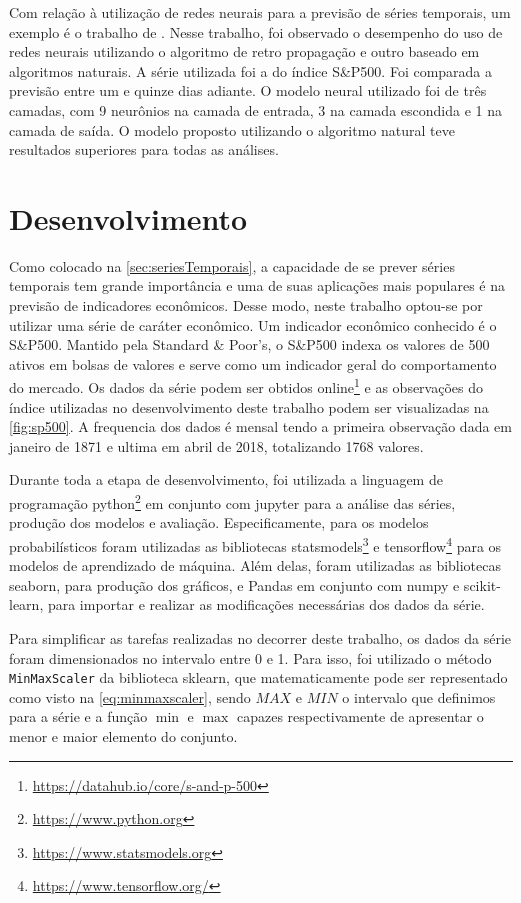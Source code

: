 \documentclass[
    12pt,
    oneside,
    a4paper,
    english,
    brazil
]{abntex2}
\begin{document}
Com relação à utilização de redes  neurais para a previsão de séries temporais,
um exemplo é o trabalho de . Nesse trabalho, foi observado
o desempenho do uso de redes neurais utilizando o algoritmo de retro propagação
e  outro baseado  em algoritmos  naturais. A  série utilizada  foi a  do índice
S\&P500. Foi  comparada a  previsão entre  um e quinze  dias adiante.  O modelo
neural utilizado foi de  três camadas, com 9 neurônios na  camada de entrada, 3
na camada  escondida e  1 na camada  de saída. O  modelo proposto  utilizando o
algoritmo natural teve resultados superiores para todas as análises.

\chapter{Desenvolvimento}\label{chap:desenv}

Como  colocado  na \autoref{sec:seriesTemporais},  a  capacidade  de se  prever
séries  temporais  tem  grande  importância  e  uma  de  suas  aplicações  mais
populares é na  previsão de indicadores econômicos. Desse  modo, neste trabalho
optou-se por  utilizar uma série  de caráter econômico. Um  indicador econômico
conhecido é  o S\&P500. Mantido  pela Standard \&  Poor's, o S\&P500  indexa os
valores  de  500  ativos  em  bolsas  de valores  e  serve  como  um  indicador
geral  do  comportamento do  mercado.  Os  dados  da  série podem  ser  obtidos
online\footnote{\url{https://datahub.io/core/s-and-p-500}} e  as observações do
índice  utilizadas no  desenvolvimento  deste trabalho  podem ser  visualizadas
na  \autoref{fig:sp500}. A  frequencia  dos  dados é  mensal  tendo a  primeira
observação dada em janeiro de 1871 e  ultima em abril de 2018, totalizando 1768
valores.

Durante  toda  a  etapa  de  desenvolvimento,  foi  utilizada  a  linguagem  de
programação   python\footnote{\url{https://www.python.org}}  em   conjunto  com
jupyter  para  a  análise  das   séries,  produção  dos  modelos  e  avaliação.
Especificamente,   para    os   modelos   probabilísticos    foram   utilizadas
as   bibliotecas    statsmodels\footnote{\url{https://www.statsmodels.org}}   e
tensorflow\footnote{\url{https://www.tensorflow.org/}}   para  os   modelos  de
aprendizado de  máquina. Além delas,  foram utilizadas as  bibliotecas seaborn,
para produção dos gráficos, e Pandas em conjunto com numpy e scikit-learn, para
importar e realizar as modificações necessárias dos dados da série.

Para simplificar as tarefas realizadas no  decorrer deste trabalho, os dados da
série foram dimensionados no intervalo entre 0  e 1. Para isso, foi utilizado o
método \texttt{MinMaxScaler}  da biblioteca  sklearn, que  matematicamente pode
ser representado como visto na \autoref{eq:minmaxscaler}, sendo $MAX$ e $MIN$ o
intervalo  que definimos  para  a série  e  a função  $\min$  e $\max$  capazes
respectivamente de apresentar o menor e maior elemento do conjunto.
\end{document}
